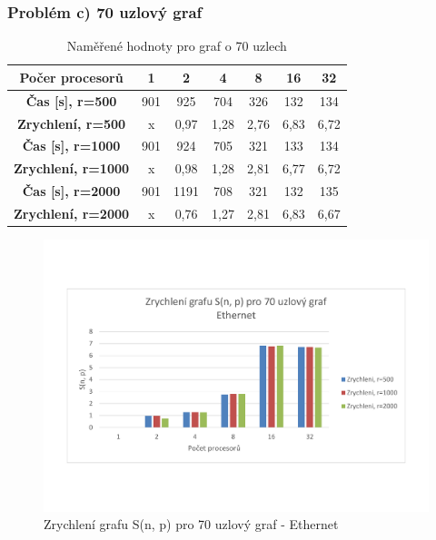 \documentclass[11pt]{article}
\begin{document}
\subsubsection{Problém c) 70 uzlový graf}
\begin{table}[h]
	\caption{Naměřené hodnoty pro graf o 70 uzlech}
	\label{tab:namereneHodnotyGraf70}
	\centering
	\begin{tabular}{| c || c | c | c | c | c | c |}
		\hline
		\textbf{Počer procesorů} & \textbf{1} & \textbf{2} & \textbf{4} & \textbf{8} & \textbf{16} & \textbf{32} \\
		\hline \hline
		\textbf{Čas [s], r=500} & 901 & 925 & 704 & 326 & 132 & 134 \\
		\hline
		\textbf{Zrychlení, r=500} & x & 0,97 & 1,28 & 2,76 & 6,83 & 6,72  \\
		\hline
		\textbf{Čas [s], r=1000} & 901 & 924 & 705 & 321 & 133 & 134 \\
		\hline
		\textbf{Zrychlení, r=1000} & x & 0,98 & 1,28 & 2,81 & 6,77 & 6,72 \\
		\hline
		\textbf{Čas [s], r=2000} & 901 & 1191 & 708 & 321 & 132 & 135 \\
		\hline
		\textbf{Zrychlení, r=2000} & x & 0,76 & 1,27 & 2,81 & 6,83 & 6,67 \\
		\hline
	\end{tabular}
\end{table}

\begin{figure}[h]
  \centering
 	\caption{Zrychlení grafu S(n, p) pro 70 uzlový graf - Ethernet}
  	\includegraphics[width=15cm]{zrychleni70.pdf}
\end{figure}
\end{document}
